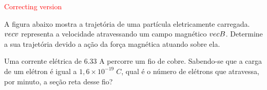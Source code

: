 \documentclass[12pt, addpoints]{exam}
\begin{document}
        \begin{center}
\textcolor{red}{\emph\Large Correcting version}\end{center}
\begin{questions}
\begin{multicols*}{2}
\question[20] A ﬁgura abaixo mostra a trajetória de uma partícula eletricamente carregada. $\\vec{{v}}$ representa a velocidade atravessando um campo magnético $\\vec{{B}}$. Determine a sua trajetória devido a ação da força magnética atuando sobre ela.
        
        \begin{center}
            \begin{minipage}[c]{0.5\linewidth}
            \end{minipage}
        \end{center}

        

\begin{oneparchoices}
\end{oneparchoices}
\question[20] Uma corrente elétrica de    6.33 A percorre um ﬁo de cobre. Sabendo-se que a carga de um elétron é igual a $1,6\times 10^{-19}\;C$, qual é o número de elétrons que atravessa, por minuto, a seção reta desse ﬁo?


\end{multicols*}
\end{questions}
\end{document}
